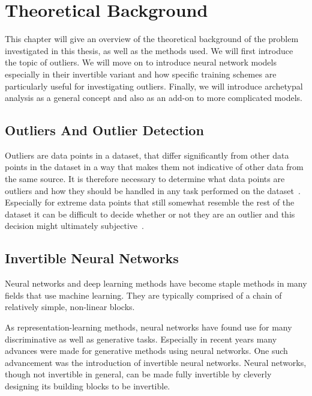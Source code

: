 \chapter{Theoretical Background}%
\label{cha:background}

This chapter will give an overview of the theoretical background of the problem
investigated in this thesis, as well as the methods used. We will first
introduce the topic of outliers. We will move on to introduce neural network models
especially in their invertible variant and how specific training schemes are
particularly useful for investigating outliers. Finally, we will introduce
archetypal analysis as a general concept and also as an add-on to more
complicated models.


\section{Outliers And Outlier Detection}%
\label{sec:outliers_an_outlier_detection}

Outliers are data points in a dataset, that differ significantly from other
data points in the dataset in a way that makes them not indicative of other
data from the same source. It is therefore necessary to determine what data
points are outliers and how they should be handled in any task performed on the
dataset~\citep{europeanmathematicalsocietyOutlierEncyclopediaMathematics}.
Especially for extreme data points that still somewhat resemble the rest of the
dataset it can be difficult to decide whether or not they are an outlier and
this decision might ultimately subjective~\citep{zimekThereBackAgain2018}.


\section{Invertible Neural Networks}%
\label{sec:invertible_neural_networks}

Neural networks and deep learning methods have become staple methods in many
fields that use machine learning. They are typically comprised of a chain of relatively
simple, non-linear blocks.~\citep{lecunDeepLearning2015}

As representation-learning methods, neural networks have found use for
many discriminative as well as generative tasks. Especially in recent years
many advances were made for generative methods using neural networks. One such
advancement was the introduction of invertible neural networks. Neural
networks, though not invertible in general, can be made fully invertible by
cleverly designing its building blocks to be invertible.


